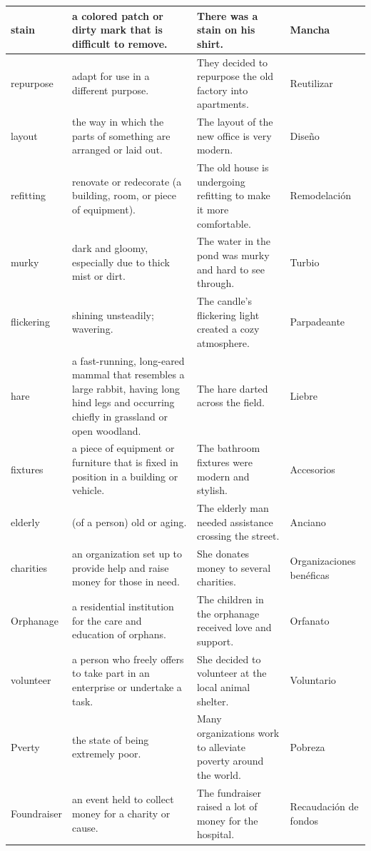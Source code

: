 \begin{longtable}{p{}p{}p{}p{}}
\hline
stain & a colored patch or dirty mark that is difficult to remove. & There was a stain on his shirt. & Mancha \\
\hline
repurpose & adapt for use in a different purpose. & They decided to repurpose the old factory into apartments. & Reutilizar \\
\hline
layout & the way in which the parts of something are arranged or laid out. & The layout of the new office is very modern. & Diseño \\
\hline
refitting & renovate or redecorate (a building, room, or piece of equipment). & The old house is undergoing refitting to make it more comfortable. & Remodelación \\
\hline
murky & dark and gloomy, especially due to thick mist or dirt. & The water in the pond was murky and hard to see through. & Turbio \\
\hline
flickering & shining unsteadily; wavering. & The candle's flickering light created a cozy atmosphere. & Parpadeante \\
\hline
hare & a fast-running, long-eared mammal that resembles a large rabbit, having long hind legs and occurring chiefly in grassland or open woodland. & The hare darted across the field. & Liebre \\
\hline
fixtures & a piece of equipment or furniture that is fixed in position in a building or vehicle. & The bathroom fixtures were modern and stylish. & Accesorios \\
\hline
elderly & (of a person) old or aging. & The elderly man needed assistance crossing the street. & Anciano \\
\hline
charities & an organization set up to provide help and raise money for those in need. & She donates money to several charities. & Organizaciones benéficas \\
\hline
Orphanage & a residential institution for the care and education of orphans. & The children in the orphanage received love and support. & Orfanato \\
\hline
volunteer & a person who freely offers to take part in an enterprise or undertake a task. & She decided to volunteer at the local animal shelter. & Voluntario \\
\hline
Pverty & the state of being extremely poor. & Many organizations work to alleviate poverty around the world. & Pobreza \\
\hline
Foundraiser & an event held to collect money for a charity or cause. & The fundraiser raised a lot of money for the hospital. & Recaudación de fondos \\

\end{longtable}
